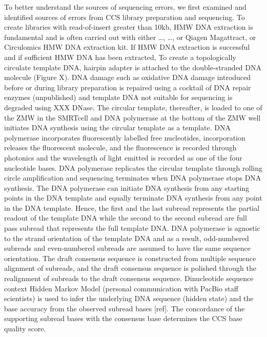 To better understand the sources of sequencing errors, we first examined and identified sources of errors from CCS library preparation and sequencing. To create libraries with read-of-insert greater than 10kb, HMW DNA extraction is fundamental and is often carried out with either …, …, or Qiagen Magattract, or Circulomics HMW DNA extraction kit. If HMW DNA extraction is successful and if sufficient HMW DNA has been extracted, To create a topologically circulate template DNA, hairpin adapter is attached to the double-stranded DNA molecule (Figure X). DNA damage such as oxidative DNA damage introduced before or during library preparation is repaired using a cocktail of DNA repair enzymes (unpublished) and template DNA not suitable for sequencing is degraded using XXX DNase. The circular template, thereafter, is loaded to one of the ZMW in the SMRTcell and DNA polymerase at the bottom of the ZMW well initiates DNA synthesis using the circular template as a template. DNA polymerase incorporates fluorescently labelled free nucleotides, incorporation releases the fluorescent molecule, and the fluorescence is recorded through photonics and the wavelength of light emitted is recorded as one of the four nucleotide bases. DNA polymerase replicates the circular template through rolling circle amplification and sequencing terminates when DNA polymerase stops DNA synthesis. The DNA polymerase can initiate DNA synthesis from any starting points in the DNA template and equally terminate DNA synthesis from any point in the DNA template. Hence, the first and the last subread represents the partial readout of the template DNA while the second to the second subread are full pass subread that represents the full template DNA. DNA polymerase is agnostic to the strand orientation of the template DNA and as a result, odd-numbered subreads and even-numbered subreads are assumed to have the same sequence orientation. The draft consensus sequence is constructed from multiple sequence alignment of subreads, and the draft consensus sequence is polished through the realignment of subreads to the draft consensus sequence. Dinucleotide sequence context Hidden Markov Model (personal communication with PacBio staff scientists) is used to infer the underlying DNA sequence (hidden state) and the base accuracy from the observed subread bases [ref]. The concordance of the supporting subread bases with the consensus base determines the CCS base quality score.

